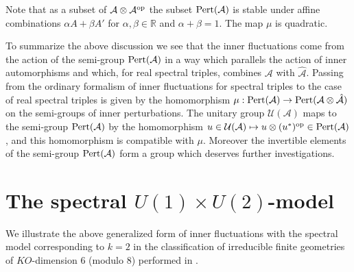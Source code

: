 \documentclass[preprint]{revtex4}
\begin{document}
Note that as a subset of ${\mathcal{A}}\otimes {\mathcal{A}}^{\rm op}$ the subset ${{\rm Pert}}({\mathcal{A}})$ is stable under affine combinations $\alpha A+\beta A'$ for $\alpha,\beta\in {\mathbb{R}}$ and $\alpha+\beta=1$. The map $\mu$ is quadratic.

To summarize the above discussion we see that the inner fluctuations come from the action of the semi-group ${{\rm Pert}}({\mathcal{A}})$ in a way which parallels the action of inner automorphisms and which, for real spectral triples, combines ${\mathcal{A}}$ with $\hat {\mathcal{A}}$.
Passing from the ordinary formalism of inner fluctuations for spectral triples to the case of real spectral triples is given by the homomorphism $\mu:{{\rm Pert}}({\mathcal{A}})\to {{\rm Pert}}({\mathcal{A}}\otimes \hat {\mathcal{A}})$ on the semi-groups of inner perturbations. The unitary group ${\mathcal{U}}({\mathcal{A}})$ maps to the semi-group ${{\rm Pert}}({\mathcal{A}})$  by the homomorphism
$u\in {\mathcal{U}}({\mathcal{A}})\mapsto u\otimes (u^*)^{\rm op}\in {{\rm Pert}}({\mathcal{A}})$, and this homomorphism is compatible with $\mu$. Moreover the invertible elements of the semi-group ${{\rm Pert}}({\mathcal{A}})$ form a group 
 which deserves further investigations.

\section{The spectral $U(1) \times U(2)$-model}

We illustrate the above generalized form of inner fluctuations with the spectral model corresponding to $k=2$ in the classification of irreducible finite geometries of $KO$-dimension $6$ (modulo $8$) performed in \cite{CC07b}. 
\end{document}
